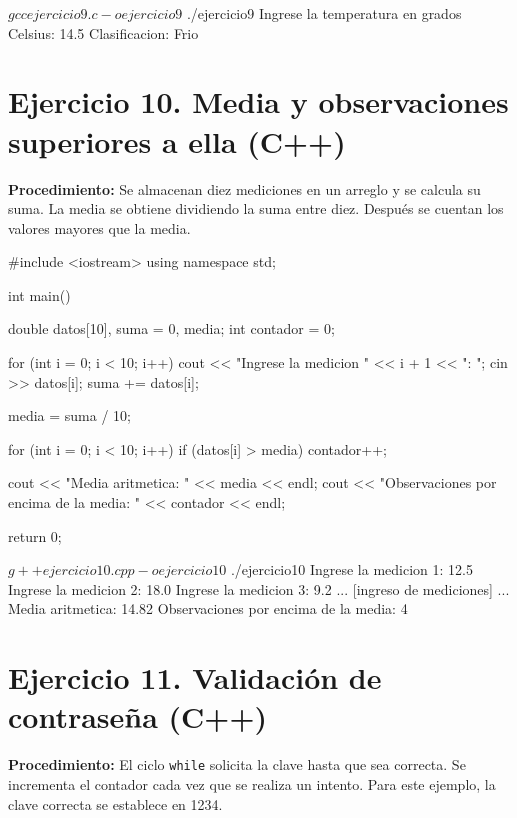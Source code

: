 \documentclass[11pt, a4paper]{article}
\begin{document}
\begin{terminalout}
$ gcc ejercicio9.c -o ejercicio9
$ ./ejercicio9
Ingrese la temperatura en grados Celsius: 14.5
Clasificacion: Frio
\end{terminalout}

\newpage

\section*{Ejercicio 10. Media y observaciones superiores a ella (C++)}
\textbf{Procedimiento:} Se almacenan diez mediciones en un arreglo y se calcula su suma. La media se obtiene dividiendo la suma entre diez. Después se cuentan los valores mayores que la media.

\begin{codebox}[title={CÓDIGO FUENTE EN C++: Ejercicio 10}]
#include <iostream>
using namespace std;

int main() {
    double datos[10], suma = 0, media;
    int contador = 0;

    for (int i = 0; i < 10; i++) {
        cout << "Ingrese la medicion " << i + 1 << ": ";
        cin >> datos[i];
        suma += datos[i];
    }

    media = suma / 10;

    for (int i = 0; i < 10; i++) {
        if (datos[i] > media) {
            contador++;
        }
    }

    cout << "Media aritmetica: " << media << endl;
    cout << "Observaciones por encima de la media: " << contador << endl;

    return 0;
}
\end{codebox}

\begin{terminalout}
$ g++ ejercicio10.cpp -o ejercicio10
$ ./ejercicio10
Ingrese la medicion 1: 12.5
Ingrese la medicion 2: 18.0
Ingrese la medicion 3: 9.2
... [ingreso de mediciones] ...
Media aritmetica: 14.82
Observaciones por encima de la media: 4
\end{terminalout}

\newpage

\section*{Ejercicio 11. Validación de contraseña (C++)}
\textbf{Procedimiento:} El ciclo \texttt{while} solicita la clave hasta que sea correcta. Se incrementa el contador cada vez que se realiza un intento. Para este ejemplo, la clave correcta se establece en 1234.
\end{document}
